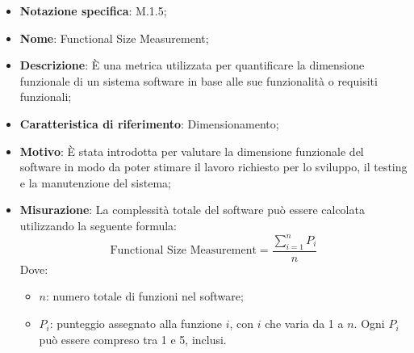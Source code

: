 \begin{itemize}
    \item \textbf{Notazione specifica}: M.1.5;
    \item \textbf{Nome}: Functional Size Measurement;
    \item \textbf{Descrizione}: È una metrica utilizzata per quantificare la dimensione funzionale di un sistema software in base alle sue funzionalità o requisiti funzionali;
    \item \textbf{Caratteristica di riferimento}: Dimensionamento;
    \item \textbf{Motivo}: È stata introdotta per valutare la dimensione funzionale del software in modo da poter stimare il lavoro richiesto per lo sviluppo, il testing e la manutenzione del sistema;
    \item \textbf{Misurazione}: La complessità totale del software può essere calcolata utilizzando la seguente formula:
    \[
    \text{Functional Size Measurement} = \frac{\sum_{i=1}^{n} P_i}{n}
    \]
    Dove:
    \begin{itemize}
        \item $n$: numero totale di funzioni nel software;
        \item $P_i$: punteggio assegnato alla funzione $i$, con $i$ che varia da 1 a $n$. Ogni $P_i$ può essere compreso tra 1 e 5, inclusi.
    \end{itemize}
   
\end{itemize}
